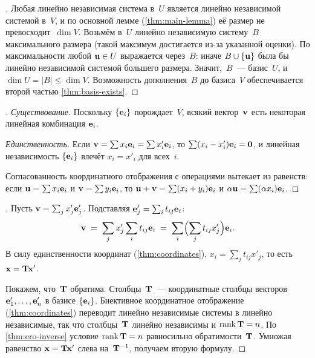 \begin{proof}[]
Любая линейно независимая система в~$U$ является линейно независимой
системой в~$V$, и по основной лемме (\cref{thm:main-lemma}) её
размер не превосходит~$\dim V$. Возьмём в~$U$ линейно независимую
систему~$B$ максимального размера (такой максимум достигается из-за
указанной оценки). По максимальности любой $\mathbf{u} \in U$ выражается
через~$B$: иначе $B \cup \{\mathbf{u}\}$ была бы линейно независимой
системой большего размера. Значит,~$B$~--- базис~$U$, и
$\dim U = |B| \le \dim V$. Возможность дополнения~$B$ до базиса~$V$
обеспечивается второй частью \cref{thm:basis-exists}.
\end{proof}

\begin{proof}[]
\emph{Существование.} Поскольку $\{\mathbf{e}_i\}$ порождает~$V$, всякий
вектор~$\mathbf{v}$ есть некоторая линейная комбинация $\mathbf{e}_i$.

\emph{Единственность.} Если $\mathbf{v} = \sum x_i \mathbf{e}_i = \sum x'_i \mathbf{e}_i$,
то $\sum (x_i - x'_i) \mathbf{e}_i = \mathbf{0}$, и линейная независимость
$\{\mathbf{e}_i\}$ влечёт $x_i = x'_i$ для всех~$i$.

Согласованность координатного отображения с операциями вытекает из
равенств: если $\mathbf{u} = \sum x_i \mathbf{e}_i$ и
$\mathbf{v} = \sum y_i \mathbf{e}_i$, то
$\mathbf{u} + \mathbf{v} = \sum(x_i + y_i)\mathbf{e}_i$ и
$\alpha \mathbf{u} = \sum (\alpha x_i)\mathbf{e}_i$.
\end{proof}

\begin{proof}[]
Пусть $\mathbf{v} = \sum_j x'_j \mathbf{e}'_j$. Подставляя
$\mathbf{e}'_j = \sum_i t_{ij}\mathbf{e}_i$:
\[
  \mathbf{v} \;=\; \sum_j x'_j \sum_i t_{ij}\mathbf{e}_i
  \;=\; \sum_i \Bigl( \sum_j t_{ij} x'_j \Bigr) \mathbf{e}_i.
\]
В силу единственности координат (\cref{thm:coordinates}),
$x_i = \sum_j t_{ij} x'_j$, то есть $\mathbf{x} = \mathbf{T}\mathbf{x}'$.

Покажем, что~$\mathbf{T}$ обратима. Столбцы~$\mathbf{T}$~--- координатные
столбцы векторов $\mathbf{e}'_1, \dots, \mathbf{e}'_n$ в базисе
$\{\mathbf{e}_i\}$. Биективное координатное отображение
(\cref{thm:coordinates}) переводит линейно независимые системы в
линейно независимые, так что столбцы~$\mathbf{T}$ линейно независимы и
$\operatorname{rank} \mathbf{T} = n$. По \cref{thm:ero-inverse} условие $\operatorname{rank} \mathbf{T} = n$
равносильно обратимости~$\mathbf{T}$. Умножая равенство
$\mathbf{x} = \mathbf{T}\mathbf{x}'$ слева на~$\mathbf{T}^{-1}$, получаем вторую
формулу.
\end{proof}

